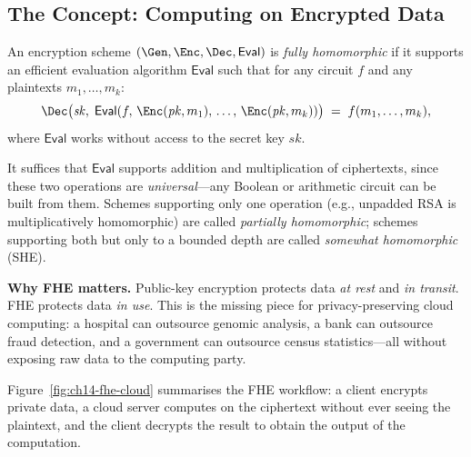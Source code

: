 \subsection{The Concept: Computing on Encrypted Data}
\label{subsec:fhe-concept}

\begin{definition}
\label{def:fhe}
An encryption scheme $(\Gen, \Enc, \Dec, \mathsf{Eval})$ is \emph{fully homomorphic} if it supports an efficient evaluation algorithm $\mathsf{Eval}$ such that for any circuit $f$ and any plaintexts $m_1, \ldots, m_k$:
\begin{equation}
\label{eq:fhe-correctness}
\Dec\bigl(\mathit{sk},\; \mathsf{Eval}(f,\, \Enc(\mathit{pk}, m_1),\, \ldots,\, \Enc(\mathit{pk}, m_k))\bigr) \;=\; f(m_1, \ldots, m_k),
\end{equation}
where $\mathsf{Eval}$ works without access to the secret key $\mathit{sk}$.
\end{definition}

It suffices that $\mathsf{Eval}$ supports addition and multiplication of ciphertexts, since these two operations are \emph{universal}---any Boolean or arithmetic circuit can be built from them.  Schemes supporting only one operation (e.g., unpadded RSA is multiplicatively homomorphic) are called \emph{partially homomorphic}; schemes supporting both but only to a bounded depth are called \emph{somewhat homomorphic} (SHE).

\begin{svgraybox}
\textbf{Why FHE matters.}
Public-key encryption protects data \emph{at rest} and \emph{in transit}.  FHE protects data \emph{in use}.  This is the missing piece for privacy-preserving cloud computing: a hospital can outsource genomic analysis, a bank can outsource fraud detection, and a government can outsource census statistics---all without exposing raw data to the computing party.
\end{svgraybox}

Figure~\ref{fig:ch14-fhe-cloud} summarises the FHE workflow: a client encrypts private data, a cloud server computes on the ciphertext without ever seeing the plaintext, and the client decrypts the result to obtain the output of the computation.

